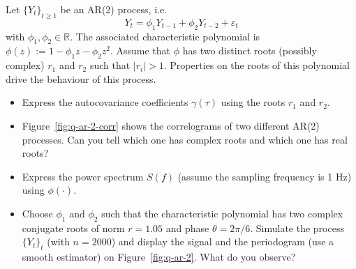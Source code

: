 \documentclass[11pt]{article}
\begin{document}
\newpage
\begin{exercise}[subtitle=AR(2) process]
Let $\{Y_t\}_{t\geq 1}$ be an AR(2) process, i.e.
\begin{equation}
    Y_t = \phi_1 Y_{t-1} + \phi_2 Y_{t-2} + \varepsilon_t
\end{equation}
with $\phi_1, \phi_2\in\mathbb{R}$.
The associated characteristic polynomial is $\phi(z):=1-\phi_1 z - \phi_2 z^2$.
Assume that $\phi$ has two distinct roots (possibly complex) $r_1$ and $r_2$ such that $|r_i|>1$.
Properties on the roots of this polynomial drive the behaviour of this process.


\begin{itemize}
    \item Express the autocovariance coefficients $\gamma(\tau)$ using the roots $r_1$ and $r_2$.
    \item Figure~\ref{fig:q-ar-2-corr} shows the correlograms of two different AR(2) processes. Can you tell which one has complex roots and which one has real roots?
    \item Express the power spectrum $S(f)$ (assume the sampling frequency is 1 Hz) using $\phi(\cdot)$.
    \item Choose $\phi_1$ and $\phi_2$ such that the characteristic polynomial has two complex conjugate roots of norm $r=1.05$ and phase $\theta=2\pi/6$. Simulate the process $\{Y_t\}_t$ (with $n=2000$) and display the signal and the periodogram (use a smooth estimator) on Figure~\ref{fig:q-ar-2}. What do you observe?
\end{itemize}



\end{exercise}
\end{document}
